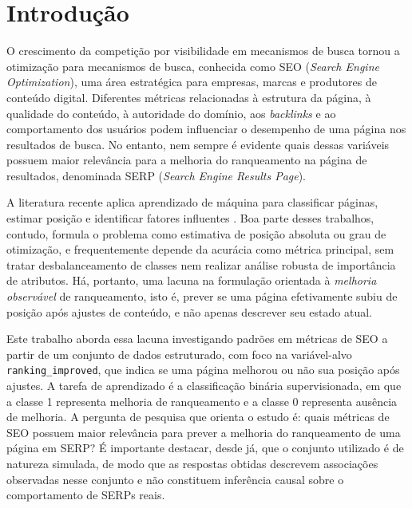 \documentclass[12pt]{article}
\begin{document}
\section{Introdução}
\label{sec:introducao}

O crescimento da competição por visibilidade em mecanismos de busca tornou a otimização para
mecanismos de busca, conhecida como SEO (\textit{Search Engine Optimization}), uma área
estratégica para empresas, marcas e produtores de conteúdo digital. Diferentes métricas
relacionadas à estrutura da página, à qualidade do conteúdo, à autoridade do domínio, aos
\textit{backlinks} e ao comportamento dos usuários podem influenciar o desempenho de uma página
nos resultados de busca. No entanto, nem sempre é evidente quais dessas variáveis possuem maior
relevância para a melhoria do ranqueamento na página de resultados, denominada SERP
(\textit{Search Engine Results Page}).

A literatura recente aplica aprendizado de máquina para classificar páginas, estimar posição e
identificar fatores influentes \cite{salminen2019,matosevic2021,saeed2024}. Boa parte desses
trabalhos, contudo, formula o problema como estimativa de posição absoluta ou grau de
otimização, e frequentemente depende da acurácia como métrica principal, sem tratar
desbalanceamento de classes nem realizar análise robusta de importância de atributos. Há,
portanto, uma lacuna na formulação orientada à \textit{melhoria observável} de ranqueamento,
isto é, prever se uma página efetivamente subiu de posição após ajustes de conteúdo, e não
apenas descrever seu estado atual.

Este trabalho aborda essa lacuna investigando padrões em métricas de SEO a partir de um conjunto
de dados estruturado, com foco na variável-alvo \texttt{ranking\_improved}, que indica se uma
página melhorou ou não sua posição após ajustes. A tarefa de aprendizado é a classificação
binária supervisionada, em que a classe 1 representa melhoria de ranqueamento e a classe 0
representa ausência de melhoria. A pergunta de pesquisa que orienta o estudo é: quais métricas de
SEO possuem maior relevância para prever a melhoria do ranqueamento de uma página em SERP? É
importante destacar, desde já, que o conjunto utilizado é de natureza simulada, de modo que as
respostas obtidas descrevem associações observadas nesse conjunto e não constituem inferência
causal sobre o comportamento de SERPs reais.
\end{document}
